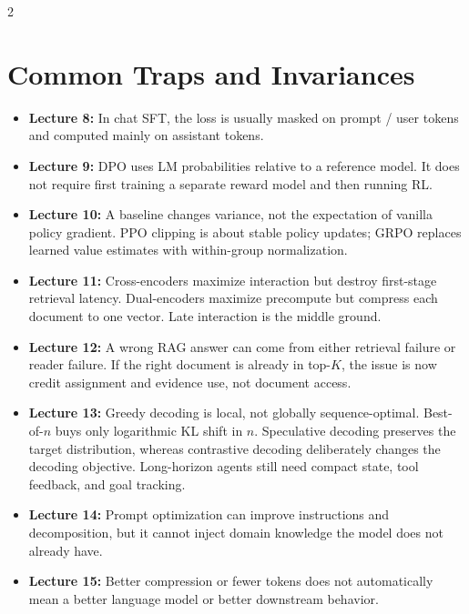 \documentclass[10pt]{article}
\begin{document}
\begin{multicols*}{2}
\section*{Common Traps and Invariances}
\begin{itemize}
\item \textbf{Lecture 8:} In chat SFT, the loss is usually masked on prompt / user tokens and computed mainly on assistant tokens.
\item \textbf{Lecture 9:} DPO uses LM probabilities relative to a reference model. It does not require first training a separate reward model and then running RL.
\item \textbf{Lecture 10:} A baseline changes variance, not the expectation of vanilla policy gradient. PPO clipping is about stable policy updates; GRPO replaces learned value estimates with within-group normalization.
\item \textbf{Lecture 11:} Cross-encoders maximize interaction but destroy first-stage retrieval latency. Dual-encoders maximize precompute but compress each document to one vector. Late interaction is the middle ground.
\item \textbf{Lecture 12:} A wrong RAG answer can come from either retrieval failure or reader failure. If the right document is already in top-\(K\), the issue is now credit assignment and evidence use, not document access.
\item \textbf{Lecture 13:} Greedy decoding is local, not globally sequence-optimal. Best-of-\(n\) buys only logarithmic KL shift in \(n\). Speculative decoding preserves the target distribution, whereas contrastive decoding deliberately changes the decoding objective. Long-horizon agents still need compact state, tool feedback, and goal tracking.
\item \textbf{Lecture 14:} Prompt optimization can improve instructions and decomposition, but it cannot inject domain knowledge the model does not already have.
\item \textbf{Lecture 15:} Better compression or fewer tokens does not automatically mean a better language model or better downstream behavior.
\end{itemize}


\end{multicols*}
\end{document}
